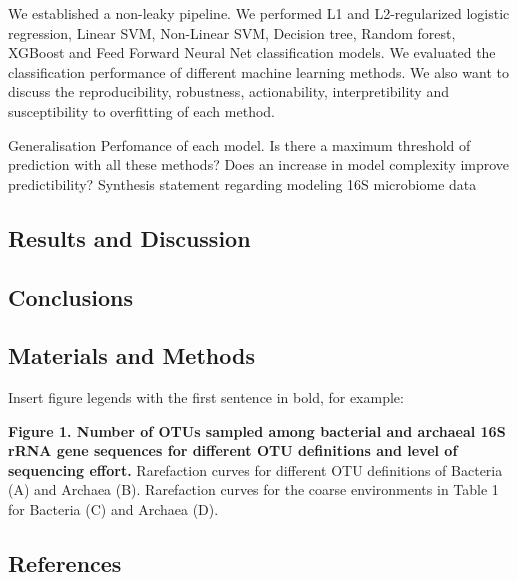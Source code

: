 \documentclass[11pt,]{article}
\begin{document}
We established a non-leaky pipeline. We performed L1 and L2-regularized
logistic regression, Linear SVM, Non-Linear SVM, Decision tree, Random
forest, XGBoost and Feed Forward Neural Net classification models. We
evaluated the classification performance of different machine learning
methods. We also want to discuss the reproducibility, robustness,
actionability, interpretibility and susceptibility to overfitting of
each method.

Generalisation Perfomance of each model. Is there a maximum threshold of
prediction with all these methods? Does an increase in model complexity
improve predictibility? Synthesis statement regarding modeling 16S
microbiome data

\subsection{Results and Discussion}\label{results-and-discussion}

\subsection{Conclusions}\label{conclusions}

\subsection{Materials and Methods}\label{materials-and-methods}

\newpage

Insert figure legends with the first sentence in bold, for example:

\textbf{Figure 1. Number of OTUs sampled among bacterial and archaeal
16S rRNA gene sequences for different OTU definitions and level of
sequencing effort.} Rarefaction curves for different OTU definitions of
Bacteria (A) and Archaea (B). Rarefaction curves for the coarse
environments in Table 1 for Bacteria (C) and Archaea (D).

\newpage

\subsection{References}\label{references}
\end{document}

